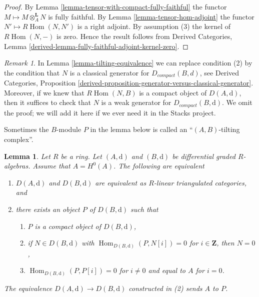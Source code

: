 \documentclass{stacks-project}
\theoremstyle{plain}
\newtheorem{lemma}[subsection]{Lemma}
\theoremstyle{definition}
\theoremstyle{remark}
\newtheorem{remark}[subsection]{Remark}
\numberwithin{equation}{subsection}
\def\Hom{\mathop{\mathrm{Hom}}\nolimits}
\begin{document}
\begin{proof}
By Lemma \ref{lemma-tensor-with-compact-fully-faithful}
the functor $M \longmapsto M \otimes_A^\mathbf{L} N$ is
fully faithful. By Lemma \ref{lemma-tensor-hom-adjoint}
the functor $N' \longmapsto R\Hom(N, N')$ is a right adjoint.
By assumption (3) the kernel of $R\Hom(N, -)$ is zero.
Hence the result follows from
Derived Categories, Lemma
\ref{derived-lemma-fully-faithful-adjoint-kernel-zero}.
\end{proof}

\begin{remark}
\label{remark-tilting-equivalence}
In Lemma \ref{lemma-tilting-equivalence} we can replace
condition (2) by the condition that $N$ is a classical
generator for $D_{compact}(B, d)$, see
Derived Categories, Proposition
\ref{derived-proposition-generator-versus-classical-generator}.
Moreover, if we knew that $R\Hom(N, B)$ is a compact object
of $D(A, \text{d})$, then it suffices to check that $N$
is a weak generator for $D_{compact}(B, \text{d})$.
We omit the proof; we will add it here if we ever
need it in the Stacks project.
\end{remark}

\noindent
Sometimes the $B$-module $P$ in the lemma below is called an
``$(A, B)$-tilting complex''.

\begin{lemma}
\label{lemma-rickard}
Let $R$ be a ring. Let $(A, \text{d})$ and $(B, \text{d})$ be
differential graded $R$-algebras. Assume that $A = H^0(A)$.
The following are equivalent
\begin{enumerate}
\item $D(A, \text{d})$ and $D(B, \text{d})$ are equivalent as $R$-linear
triangulated categories, and
\item there exists an object $P$ of $D(B, \text{d})$ such that
\begin{enumerate}
\item $P$ is a compact object of $D(B, \text{d})$,
\item if $N \in D(B, \text{d})$ with $\Hom_{D(B, \text{d})}(P, N[i]) = 0$
for $i \in \mathbf{Z}$, then $N = 0$,
\item $\Hom_{D(B, \text{d})}(P, P[i]) = 0$ for $i \not = 0$ and
equal to $A$ for $i = 0$.
\end{enumerate}
\end{enumerate}
The equivalence $D(A, \text{d}) \to D(B, \text{d})$
constructed in (2) sends $A$ to $P$.
\end{lemma}
\end{document}
